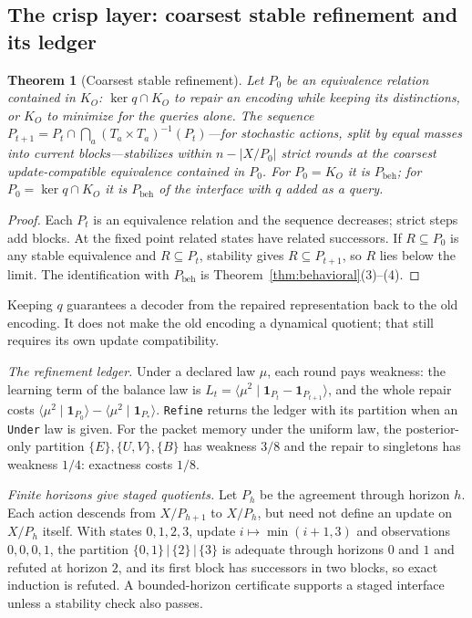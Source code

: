 \documentclass[11pt]{article}
\newcommand{\code}[1]{\texttt{#1}}
\newcommand{\br}[2]{\langle #1 \mid #2 \rangle}
\newcommand{\Pbeh}{P_{\mathrm{beh}}}
\theoremstyle{definition}
\theoremstyle{plain}
\newtheorem{theorem}[definition]{Theorem}
\begin{document}
\subsection{The crisp layer: coarsest stable refinement and its ledger}\label{sec:crisp}

\begin{theorem}[Coarsest stable refinement]\label{thm:refine}
Let $P_0$ be an equivalence relation contained in $K_O$: $\ker q\cap K_O$ to repair an encoding
while keeping its distinctions, or $K_O$ to minimize for the queries alone. The sequence
$P_{t+1}=P_t\cap\bigcap_a(T_a\times T_a)^{-1}(P_t)$---for stochastic actions, split by equal
masses into current blocks---stabilizes within $n-|X/P_0|$ strict rounds at the coarsest
update-compatible equivalence contained in $P_0$. For $P_0=K_O$ it is $\Pbeh$; for
$P_0=\ker q\cap K_O$ it is $\Pbeh$ of the interface with $q$ added as a query.
\end{theorem}

\begin{proof}
Each $P_t$ is an equivalence relation and the sequence decreases; strict steps add blocks. At the
fixed point related states have related successors. If $R\subseteq P_0$ is any stable
equivalence and $R\subseteq P_t$, stability gives $R\subseteq P_{t+1}$, so $R$ lies below the
limit. The identification with $\Pbeh$ is Theorem~\ref{thm:behavioral}(3)--(4).
\end{proof}

Keeping $q$ guarantees a decoder from the repaired representation back to the old encoding. It
does not make the old encoding a dynamical quotient; that still requires its own update
compatibility.

\emph{The refinement ledger.} Under a declared law $\mu$, each round pays weakness: the learning
term of the balance law is $L_t=\br{\mu^2}{\mathbf 1_{P_t}-\mathbf 1_{P_{t+1}}}$, and the whole
repair costs $\br{\mu^2}{\mathbf 1_{P_0}}-\br{\mu^2}{\mathbf 1_{P_\ast}}$. \code{Refine} returns the
ledger with its partition when an \code{Under} law is given. For the packet memory under the
uniform law, the posterior-only partition $\{E\},\{U,V\},\{B\}$ has weakness $3/8$ and the repair
to singletons has weakness $1/4$: exactness costs $1/8$.

\emph{Finite horizons give staged quotients.} Let $P_h$ be the agreement through horizon $h$.
Each action descends from $X/P_{h+1}$ to $X/P_h$, but need not define an update on $X/P_h$
itself. With states $0,1,2,3$, update $i\mapsto\min(i+1,3)$ and observations $0,0,0,1$, the
partition $\{0,1\}\,|\,\{2\}\,|\,\{3\}$ is adequate through horizons $0$ and $1$ and refuted at
horizon $2$, and its first block has successors in two blocks, so exact induction is refuted. A
bounded-horizon certificate supports a staged interface unless a stability check also passes.
\end{document}
